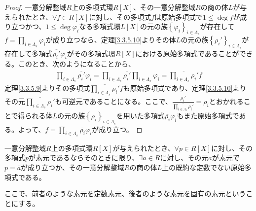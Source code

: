 \documentclass[dvipdfmx]{jsarticle}
\begin{document}
\begin{proof}
一意分解整域$R$上の多項式環$R[ X]$、その一意分解整域$R$の商の体$L$が与えられたとき、$\forall f \in R[ X]$に対し、その多項式$f$は原始多項式で$1 \leq \deg f$が成り立つかつ、$1 \leq \deg\varphi_{i}$なる多項式環$L[ X]$の元の族$\left\{ \varphi_{i} \right\}_{i \in \varLambda_{s}}$が存在して$f = \prod_{i \in \varLambda_{s}} \varphi_{i}$が成り立つなら、定理\ref{3.3.5.10}よりその体$L$の元の族$\left\{ \rho_{i}' \right\}_{i \in \varLambda_{s}}$が存在して多項式$\overline{\rho_{i}'}\varphi_{i}$がその多項式環$R[ X]$における原始多項式であることができる。このとき、次のようになることから、
\begin{align*}
\prod_{i \in \varLambda_{s}} {\overline{\rho_{i}'}\varphi_{i}} = \prod_{i \in \varLambda_{s}} \overline{\rho_{i}'}\prod_{i \in \varLambda_{s}} \varphi_{i} = \overline{\prod_{i \in \varLambda_{s}} \rho_{i}'}f
\end{align*}
定理\ref{3.3.5.9}よりその多項式$\overline{\prod_{i \in \varLambda_{s}} \rho_{i}'}f$も原始多項式であり、定理\ref{3.3.5.10}よりその元$\overline{\prod_{i \in \varLambda_{s}} \rho_{i}'}$も可逆元であることになる。ここで、$\frac{\rho_{i}'}{\overline{\prod_{i \in \varLambda_{s}} \rho_{i}'}} = \rho_{i}$とおかれることで得られる体$L$の元の族$\left\{ \rho_{i} \right\}_{i \in \varLambda_{s}}$を用いた多項式$\overline{\rho_{i}}\varphi_{i}$もまた原始多項式である。よって、$f = \prod_{i \in \varLambda_{s}} {\overline{\rho_{i}}\varphi_{i}}$が成り立つ。
\end{proof}
\begin{thm}\label{3.3.5.12}
一意分解整域$R$上の多項式環$R[ X]$が与えられたとき、$\forall p \in R[ X]$に対し、その多項式$p$が素元であるならそのときに限り、$\exists a \in R$に対し、その元$a$が素元で$p = \overline{a}$が成り立つか、その一意分解整域$R$の商の体$L$上の既約な定数でない原始多項式である。
\end{thm}
\begin{dfn}
ここで、前者のような素元を定数素元、後者のような素元を固有の素元ということにする。
\end{dfn}
\end{document}
